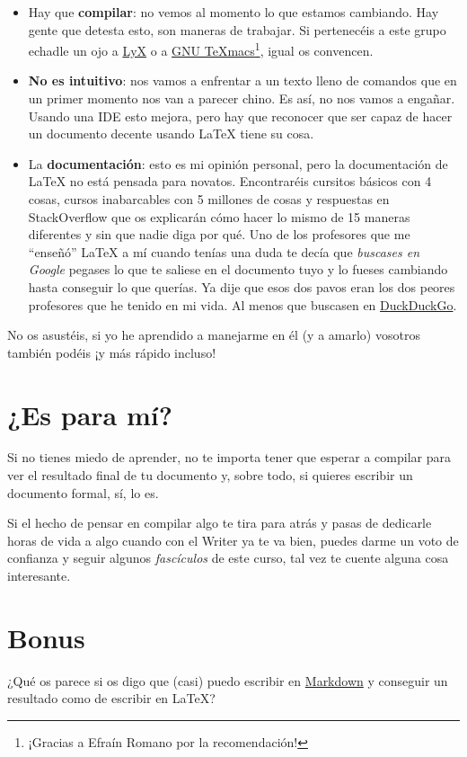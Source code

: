 \begin{itemize}
\item
  Hay que \textbf{compilar}: no vemos al momento lo que estamos
  cambiando. Hay gente que detesta esto, son maneras de trabajar. Si
  pertenecéis a este grupo echadle un ojo a
  \href{http://www.lyx.org/}{LyX} o a \href{http://texmacs.org/tmweb/home/welcome.en.html}{GNU TeXmacs}\footnote{¡Gracias a Efraín Romano por la recomendación!}, 
  igual os convencen.
\item
  \textbf{No es intuitivo}: nos vamos a enfrentar a un texto lleno de
  comandos que en un primer momento nos van a parecer chino. Es así, no
  nos vamos a engañar. Usando una IDE esto mejora, pero hay que
  reconocer que ser capaz de hacer un documento decente usando LaTeX
  tiene su cosa.
\item
  La \textbf{documentación}: esto es mi opinión personal, pero la
  documentación de LaTeX no está pensada para novatos. Encontraréis
  cursitos básicos con 4 cosas, cursos inabarcables con 5 millones de
  cosas y respuestas en StackOverflow que os explicarán cómo hacer lo
  mismo de 15 maneras diferentes y sin que nadie diga por qué. Uno de
  los profesores que me ``enseñó'' LaTeX a mí cuando tenías una duda te
  decía que \emph{buscases en Google} pegases lo que te saliese en el
  documento tuyo y lo fueses cambiando hasta conseguir lo que querías.
  Ya dije que esos dos pavos eran los dos peores profesores que he
  tenido en mi vida. Al menos que buscasen en
  \href{https://duckduckgo.com/api}{DuckDuckGo}.
\end{itemize}

No os asustéis, si yo he aprendido a manejarme en él (y a amarlo)
vosotros también podéis ¡y más rápido incluso!

\section{¿Es para mí?}\label{es-para-mi}

Si no tienes miedo de aprender, no te importa tener que esperar a
compilar para ver el resultado final de tu documento y, sobre todo, si
quieres escribir un documento formal, sí, lo es.

Si el hecho de pensar en compilar algo te tira para atrás y pasas de
dedicarle horas de vida a algo cuando con el Writer ya te va bien,
puedes darme un voto de confianza y seguir algunos \emph{fascículos} de
este curso, tal vez te cuente alguna cosa interesante.

\section{Bonus}\label{bonus}

¿Qué os parece si os digo que (casi)
puedo escribir en 
\href{http://daringfireball.net/projects/markdown/}{Markdown} 
y conseguir un resultado como de escribir en LaTeX?
